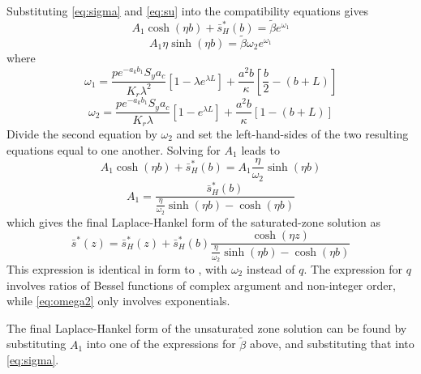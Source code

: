 \documentclass{article}
\begin{document}
Substituting \eqref{eq:sigma} and \eqref{eq:su} into the compatibility equations gives
$$  A_1 \cosh(\eta b) + \bar{s}_H^{\ast}(b) = \tilde{\beta}e^{\omega_1}$$
$$ A_1 \eta  \sinh(\eta b)  = \tilde{\beta} \omega_2 e^{\omega_1}$$
where 
$$ \omega_1 = \frac{p e^{-a_k b_1} S_y a_c} {K_r \lambda^2} \left[ 1  - \lambda e^{\lambda L} \right] + \frac{a^2 b}{\kappa}\left[\frac{b}{2} - \left( b+L\right) \right]$$
\begin{equation}
  \label{eq:omega2}
  \omega_2 = \frac{p e^{-a_k b_1} S_y a_c} {K_r \lambda} \left[ 1  -  e^{\lambda L} \right] + \frac{a^2 b}{\kappa}\left[1 - \left( b+L\right) \right]
\end{equation}
Divide the second equation by $\omega_2$ and set the left-hand-sides of the two resulting equations equal to one another.  Solving for $A_1$ leads to
$$A_1 \cosh(\eta b) + \bar{s}_H^{\ast}(b) = A_1 \frac{\eta}{\omega_2}  \sinh(\eta b) $$
$$ A_1 = \frac{\bar{s}_H^{\ast}(b)}{\frac{\eta}{\omega_2}  \sinh(\eta b) - \cosh(\eta b)}$$
which gives the final Laplace-Hankel form of the saturated-zone solution as
$$ \bar{s}^{\ast}(z)  = \bar{s}_H^{\ast}(z) + \bar{s}_H^{\ast}(b) \frac{\cosh(\eta z)}{\frac{\eta}{\omega_2}  \sinh(\eta b) - \cosh(\eta b)}$$ 
This expression is identical in form to \cite[eqn.\ C17]{mishra10}, with $\omega_2$ instead of $q$.  The expression for $q$ \cite[eqn.\ D13]{mishra10} involves ratios of Bessel functions of complex argument and non-integer order, while \eqref{eq:omega2} only involves exponentials.

The final Laplace-Hankel form of the unsaturated zone solution can be found by substituting $A_1$ into one of the expressions for $\tilde\beta$ above, and substituting that into \eqref{eq:sigma}.


\end{document}
